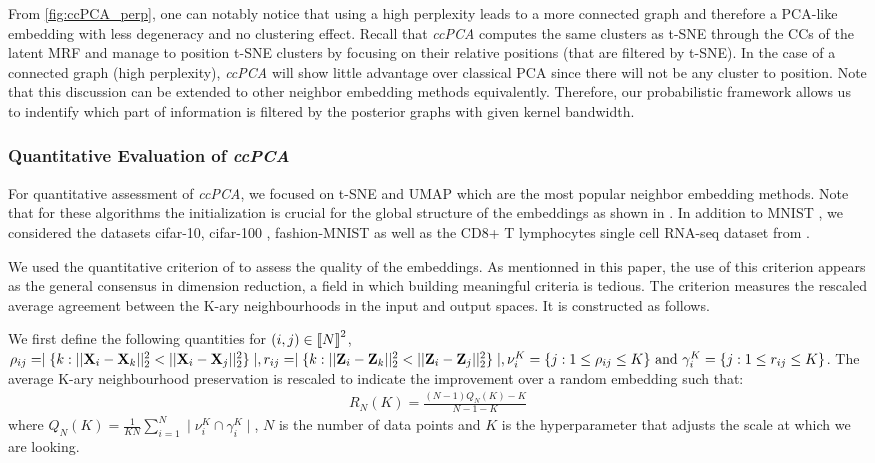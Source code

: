 From \cref{fig:ccPCA_perp}, one can notably notice that using a high perplexity leads to a more connected graph and therefore a PCA-like embedding with less degeneracy and no clustering effect. Recall that \textit{ccPCA} computes the same clusters as t-SNE through the CCs of the latent MRF and manage to position t-SNE clusters by focusing on their relative positions (that are filtered by t-SNE). In the case of a connected graph (high perplexity), \textit{ccPCA} will show little advantage over classical PCA since there will not be any cluster to position. Note that this discussion can be extended to other neighbor embedding methods equivalently. Therefore, our probabilistic framework allows us to indentify which part of information is filtered by the posterior graphs with given kernel bandwidth.

\subsubsection{Quantitative Evaluation of \textit{ccPCA}}\label{sec:quantitative_evaluation}

For quantitative assessment of \textit{ccPCA}, we focused on t-SNE \citep{maaten2008tSNE} and UMAP \citep{mcinnes2018umap} which are the most popular neighbor embedding methods. Note that for these algorithms the initialization is crucial for the global structure of the embeddings as shown in \citep{kobak2021initialization}. In addition to MNIST \citep{deng2012mnist}, we considered the datasets cifar-10, cifar-100 \citep{krizhevsky2009cifar}, fashion-MNIST \citep{xiao2017fashion} as well as the CD8+ T lymphocytes single cell RNA-seq dataset from \citep{kurd2020early}.

We used the quantitative criterion of \citep{lee2015multi} to assess the quality of the embeddings. As mentionned in this paper, the use of this criterion appears as the general consensus in dimension reduction, a field in which building meaningful criteria is tedious. The criterion measures the rescaled average agreement between the K-ary neighbourhoods in the input and output spaces. It is constructed as follows.

We first define the following quantities for $(i,j) \in {[\![N]\!]}^2$,
$\rho_{ij} = \mid \{ k: ||\mathbf{X}_{i} - \mathbf{X}_k ||^2_2 < ||\mathbf{X}_{i} - \mathbf{X}_j ||^2_2 \} \mid, r_{ij} = \mid \{ k: ||\mathbf{Z}_{i} - \mathbf{Z}_k ||^2_2 < ||\mathbf{Z}_{i} - \mathbf{Z}_j ||^2_2 \} \mid, \nu_i^K = \{ j : 1 \leq \rho_{ij} \leq K \} \text{ and } \gamma_i^K = \{ j : 1 \leq r_{ij} \leq K \}$. The average K-ary neighbourhood preservation is rescaled to indicate the improvement over a random embedding such that:
\begin{align}\label{def_R}
R_{N}(K) = \frac{(N-1) Q_{N}(K) - K }{N-1-K}
\end{align}
where $Q_{N}(K) = \frac{1}{KN} \sum_{i=1}^N \mid \nu_i^K \cap \gamma_i^K \mid$, $N$ is the number of data points and $K$ is the hyperparameter that adjusts the scale at which we are looking.

